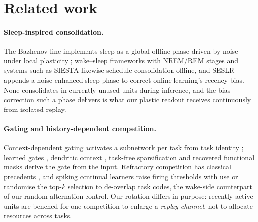 \documentclass{article}
\begin{document}
\section{Related work}
\label{sec:related}

\paragraph{Sleep-inspired consolidation.} The Bazhenov line implements sleep as a global
offline phase driven by noise under local plasticity \citep{tadros2022,bazhenov2026,golden2022,kubo2025};
wake--sleep frameworks with NREM/REM stages \citep{sorrenti2024,robinson2022} and systems such
as SIESTA \citep{harun2023} likewise schedule consolidation offline, and SESLR \citep{lin2026}
appends a noise-enhanced sleep phase to correct online learning's recency bias. None
consolidates in currently unused units during inference, and the bias correction such a phase
delivers is what our plastic readout receives continuously from isolated replay.

\paragraph{Gating and history-dependent competition.} Context-dependent gating activates a
subnetwork per task from task identity \citep{masse2018}; learned gates \citep{tilley2023},
dendritic context \citep{iyer2022}, task-free sparsification \citep{lassig2023} and recovered
functional masks \citep{mckee2026} derive the gate from the input. Refractory competition has
classical precedents \citep{kaski1994,maeda1999}, and spiking continual learners raise firing
thresholds with use \citep{shen2024} or randomise the top-$k$ selection \citep{shen2026} to
de-overlap task codes, the wake-side counterpart of our random-alternation control. Our
rotation differs in purpose: recently active units are benched for one competition to enlarge
a \emph{replay channel}, not to allocate resources across tasks.
\end{document}

